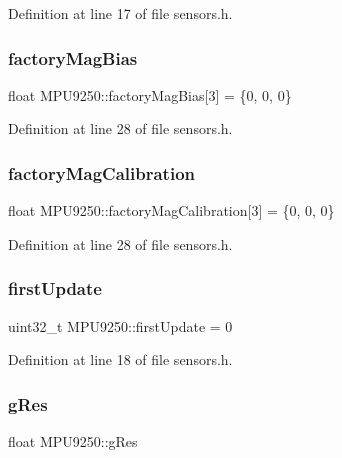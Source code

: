 Definition at line 17 of file sensors.\+h.

\mbox{\label{classMPU9250_af34938d098b83ec910bee1b51a41972f}} 
\subsubsection{\texorpdfstring{factory\+Mag\+Bias}{factoryMagBias}}
{\footnotesize\ttfamily float M\+P\+U9250\+::factory\+Mag\+Bias\mbox{[}3\mbox{]} = \{0, 0, 0\}}



Definition at line 28 of file sensors.\+h.

\mbox{\label{classMPU9250_a30d462461868e4f306c2f47d1adbd1d2}} 
\subsubsection{\texorpdfstring{factory\+Mag\+Calibration}{factoryMagCalibration}}
{\footnotesize\ttfamily float M\+P\+U9250\+::factory\+Mag\+Calibration\mbox{[}3\mbox{]} = \{0, 0, 0\}}



Definition at line 28 of file sensors.\+h.

\mbox{\label{classMPU9250_a4ea2c930abf4529a3888885f9d928cf4}} 
\subsubsection{\texorpdfstring{first\+Update}{firstUpdate}}
{\footnotesize\ttfamily uint32\+\_\+t M\+P\+U9250\+::first\+Update = 0}



Definition at line 18 of file sensors.\+h.

\mbox{\label{classMPU9250_a2c137b20138d3c80c4828691d5656d92}} 
\subsubsection{\texorpdfstring{g\+Res}{gRes}}
{\footnotesize\ttfamily float M\+P\+U9250\+::g\+Res}



